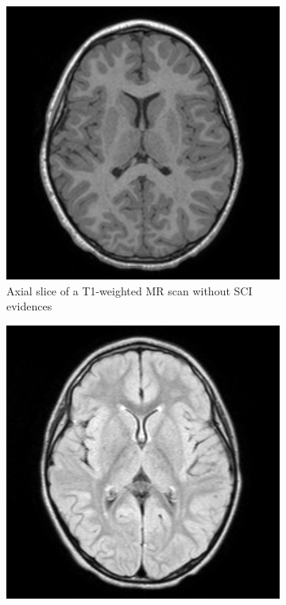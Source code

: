 \documentclass{standalone}
\begin{document}
\begin{figure}[h!]
		\centering
        \begin{subfigure}[b]{0.45\textwidth}
             \includegraphics[scale=0.13]{img/Chap1/Normal_T1.png}
             \caption{Axial slice of a T1-weighted MR scan without SCI evidences}
             \label{fig:Normal_T1}
        \end{subfigure}
        \hfill
        \begin{subfigure}[b]{0.45\textwidth}
             \includegraphics[scale=0.13]{img/Chap1/Normal_flair.png}

\end{subfigure}
\end{figure}
\end{document}
